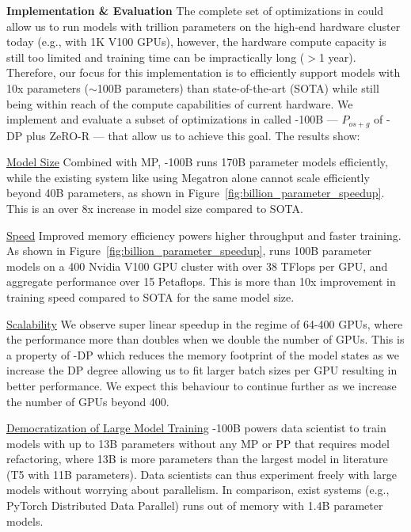 {\bf Implementation \& Evaluation}
The complete set of optimizations in \name could allow us to run models with trillion parameters on the high-end hardware cluster today (e.g., with 1K V100 GPUs), however, the hardware compute capacity is still too limited and training time can be impractically long ($>$1 year).  Therefore, our focus for this implementation is to efficiently support models with 10x parameters ($\sim$100B parameters) than state-of-the-art (SOTA) while still being within reach of the compute capabilities of current hardware. We implement and evaluate a subset of optimizations in \name called \name-100B --- $P_{os+g}$ of \name-DP plus ZeRO-R --- that allow us to achieve this goal. The results show:

\underline{Model Size} Combined with MP, \name-100B runs 170B parameter models efficiently, while the existing system like using Megatron alone cannot scale efficiently beyond 40B parameters, as shown in Figure~\ref{fig:billion_parameter_speedup}.
This is an over 8x increase in model size compared to SOTA.

\underline{Speed} Improved memory efficiency powers higher throughput and faster training. 
As shown in Figure~\ref{fig:billion_parameter_speedup}, \name runs 100B parameter models on a 400 Nvidia V100 GPU cluster with over 38 TFlops per GPU, and aggregate performance over 15 Petaflops. This is more than 10x improvement in training speed compared to SOTA for the same model size.

\underline{Scalability} We observe super linear speedup in the regime of 64-400 GPUs, where the performance more than doubles when we double the number of GPUs. This is a property of \name-DP which reduces the memory footprint of the model states as we increase the DP degree allowing us to fit larger batch sizes per GPU resulting in better performance. We expect this behaviour to continue further as we increase the number of GPUs beyond 400.

\underline{Democratization of Large Model Training} \name-100B powers data scientist to train models with up to 13B parameters without any MP or PP that requires model refactoring, where 13B is more parameters than the largest model in literature (T5 with 11B parameters). Data scientists can thus experiment freely with large models without worrying about parallelism. In comparison, exist systems (e.g., PyTorch Distributed Data Parallel) runs out of memory with 1.4B parameter models. 

